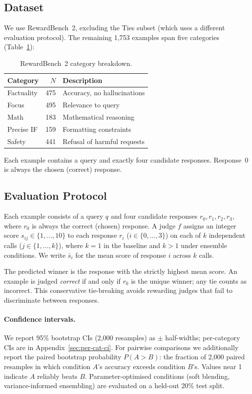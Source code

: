 \documentclass{article}
\begin{document}
\subsection{Dataset}
\label{sec:dataset}

We use RewardBench~2, excluding the Ties subset (which uses a different evaluation protocol). The remaining 1,753 examples span five categories (Table~\ref{tab:dataset}):

\begin{table}[ht]
\centering
\caption{RewardBench~2 category breakdown.}
\label{tab:dataset}
\small
\begin{tabular}{lrl}
\toprule
Category & $N$ & Description \\
\midrule
Factuality & 475 & Accuracy, no hallucinations \\
Focus      & 495 & Relevance to query \\
Math       & 183 & Mathematical reasoning \\
Precise IF & 159 & Formatting constraints \\
Safety     & 441 & Refusal of harmful requests \\
\bottomrule
\end{tabular}
\end{table}

Each example contains a query and exactly four candidate responses. Response~0 is always the chosen (correct) response.

\subsection{Evaluation Protocol}
\label{sec:protocol}

Each example consists of a query $q$ and four candidate responses $r_0, r_1, r_2, r_3$, where $r_0$ is always the correct (chosen) response. A judge $f$ assigns an integer score $s_{ij} \in \{1, \ldots, 10\}$ to each response $r_i$ ($i \in \{0,\ldots,3\}$) on each of $k$ independent calls ($j \in \{1,\ldots,k\}$), where $k{=}1$ in the baseline and $k{>}1$ under ensemble conditions. We write $\bar{s}_i$ for the mean score of response $i$ across $k$ calls.

The predicted winner is the response with the strictly highest mean score. An example is judged \emph{correct} if and only if $r_0$ is the unique winner; any tie counts as incorrect. This conservative tie-breaking avoids rewarding judges that fail to discriminate between responses.

\paragraph{Confidence intervals.} We report 95\% bootstrap CIs (2,000 resamples) as $\pm$ half-widths; per-category CIs are in Appendix~\ref{sec:per-cat-ci}. For pairwise comparisons we additionally report the paired bootstrap probability $P(A > B)$: the fraction of 2,000 paired resamples in which condition $A$'s accuracy exceeds condition $B$'s. Values near 1 indicate $A$ reliably beats $B$. Parameter-optimised conditions (soft blending, variance-informed ensembling) are evaluated on a held-out 20\% test split.
\end{document}
